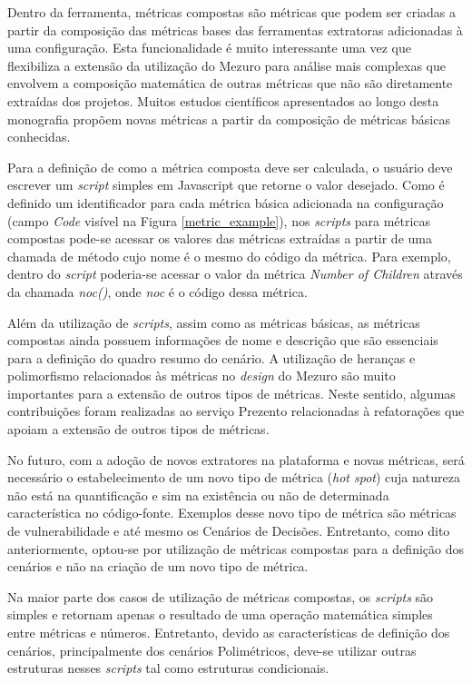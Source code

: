 Dentro da ferramenta, métricas compostas são métricas que podem ser criadas a partir da composição das métricas bases das ferramentas extratoras adicionadas à uma configuração. Esta funcionalidade é muito interessante uma vez que flexibiliza a extensão da utilização do Mezuro para análise mais complexas que envolvem a composição matemática de outras métricas que não são diretamente extraídas dos projetos. Muitos estudos científicos apresentados ao longo desta monografia propõem novas métricas a partir da composição de métricas básicas conhecidas.

Para a definição de como a métrica composta deve ser calculada, o usuário deve escrever um \emph{script} simples em Javascript que retorne o valor desejado. Como é definido um identificador para cada métrica básica adicionada na configuração (campo \emph{Code} visível na Figura \ref{metric_example}), nos \emph{scripts} para métricas compostas pode-se acessar os valores das métricas extraídas a partir de uma chamada de método cujo nome é o mesmo do código da métrica. Para exemplo, dentro do \emph{script} poderia-se acessar o valor da métrica \emph{Number of Children} através da chamada \emph{noc()}, onde \emph{noc} é o código dessa métrica.

Além da utilização de \emph{scripts}, assim como as métricas básicas, as métricas compostas ainda possuem informações de nome e descrição que são essenciais para a definição do quadro resumo do cenário. A utilização de heranças e polimorfismo relacionados às métricas no \emph{design} do Mezuro são muito importantes para a extensão de outros tipos de métricas. Neste sentido, algumas contribuições foram realizadas ao serviço Prezento relacionadas à refatorações que apoiam a extensão de outros tipos de métricas. 

No futuro, com a adoção de novos extratores na plataforma e novas métricas, será necessário o estabelecimento de um novo tipo de métrica (\emph{hot spot}) cuja natureza não está na quantificação e sim na existência ou não de determinada característica no código-fonte. Exemplos desse novo tipo de métrica são métricas de vulnerabilidade e até mesmo os Cenários de Decisões. Entretanto, como dito anteriormente, optou-se por utilização de métricas compostas para a definição dos cenários e não na criação de um novo tipo de métrica.

Na maior parte dos casos de utilização de métricas compostas, os \emph{scripts} são simples e retornam apenas o resultado de uma operação matemática simples entre métricas e números. Entretanto, devido as características de definição dos cenários, principalmente dos cenários Polimétricos, deve-se utilizar outras estruturas nesses \emph{scripts} tal como estruturas condicionais.

